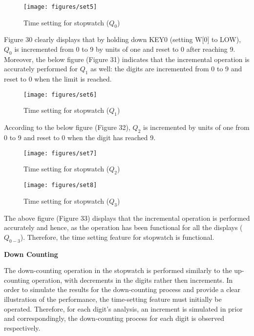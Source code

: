 \documentclass[12pt,a4paper]{article}
\begin{document}
	\begin{figure}[H]
		\centering
		\texttt{[image: figures/set5]}
		\caption{Time setting for stopwatch ($Q_{0}$)}
	\end{figure}
	
	\noindent Figure 30 clearly displays that by holding down KEY0 (setting W[0] to LOW), $Q_{0}$ is incremented from 0 to 9 by units of one and reset to 0 after reaching 9. Moreover, the below figure (Figure 31) indicates that the incremental operation is accurately performed for $Q_{1}$ as well: the digits are incremented from 0 to 9 and reset to 0 when the limit is reached.
	
	\begin{figure}[H]
		\centering
		\texttt{[image: figures/set6]}
		\caption{Time setting for stopwatch ($Q_{1}$)}
	\end{figure}
	
	\noindent According to the below figure (Figure 32), $Q_{2}$ is incremented by units of one from 0 to 9 and reset to 0 when the digit has reached 9. 
	
	\begin{figure}[H]
		\centering
		\texttt{[image: figures/set7]}
		\caption{Time setting for stopwatch ($Q_{2}$)}
	\end{figure}
	
	\begin{figure}[H]
		\centering
		\texttt{[image: figures/set8]}
		\caption{Time setting for stopwatch ($Q_{3}$)}
	\end{figure}
	
	\noindent The above figure (Figure 33) displays that the incremental operation is performed accurately and hence, as the operation has been functional for all the displays ($Q_{0-3}$). Therefore, the time setting feature for stopwatch is functional.
	
	\vspace{0.2cm}
	\noindent \textbf{Down Counting}
	\vspace{0.2cm}
	
	\noindent The down-counting operation in the stopwatch is performed similarly to the up-counting operation, with decrements in the digits rather then increments. In order to simulate the results for the down-counting process and provide a clear illustration of the performance, the time-setting feature must initially be operated. Therefore, for each digit's analysis, an increment is simulated in prior and correspondingly, the down-counting process for each digit is observed respectively.
	
\end{document}
